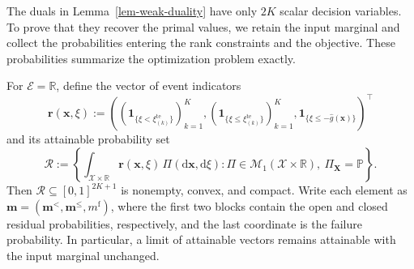 The duals in Lemma~\ref{lem-weak-duality} have only $2K$ scalar decision variables. To prove that they recover the primal values, we retain the input marginal and collect the probabilities entering the rank constraints and the objective. These probabilities summarize the optimization problem exactly.

\begin{lemma}
  \label{lem-attainable-probabilities}
  For $\mathcal E=\mathbb R$, define the vector of event indicators
  \begin{equation}
    \bm r(\bm x,\xi):=
    \left(
      \left(\mathbf1_{\{\xi<\xi_{(k)}^{\mathrm{te}}\}}\right)_{k=1}^K,
      \left(\mathbf1_{\{\xi\le\xi_{(k)}^{\mathrm{te}}\}}\right)_{k=1}^K,
      \mathbf1_{\{\xi\le-\hat g(\bm x)\}}
    \right)^\top
    \label{eq-event-probability-vector}
  \end{equation}
  and its attainable probability set
  \begin{equation}
    \mathcal R:=\left\{
      \int_{\mathcal X\times\mathbb R}\bm r(\bm x,\xi)\,\Pi(\mathrm d\bm x,\mathrm d\xi):
      \Pi\in\mathcal M_1(\mathcal X\times\mathbb R),\ \Pi_{\bm X}=\mathbb P
    \right\}.
    \label{eq-attainable-probability-set}
  \end{equation}
  Then $\mathcal R\subseteq[0,1]^{2K+1}$ is nonempty, convex, and compact. Write each element as $\bm m=(\bm m^{<},\bm m^{\le},m^{\mathrm f})$, where the first two blocks contain the open and closed residual probabilities, respectively, and the last coordinate is the failure probability. In particular, a limit of attainable vectors remains attainable with the input marginal unchanged.
\end{lemma}
